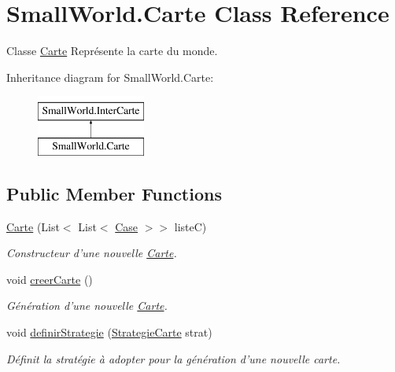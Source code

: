 \hypertarget{class_small_world_1_1_carte}{\section{Small\-World.\-Carte Class Reference}
\label{class_small_world_1_1_carte}
}


Classe \hyperlink{class_small_world_1_1_carte}{Carte} Représente la carte du monde.  


Inheritance diagram for Small\-World.\-Carte\-:\begin{figure}[H]
\begin{center}
\leavevmode
\includegraphics[height=2.000000cm]{class_small_world_1_1_carte}
\end{center}
\end{figure}
\subsection*{Public Member Functions}
\begin{DoxyCompactItemize}
\item 
\hyperlink{class_small_world_1_1_carte_a3795b7cf629c8e9151bbb2410bc39eb3}{Carte} (List$<$ List$<$ \hyperlink{class_small_world_1_1_case}{Case} $>$$>$ liste\-C)
\begin{DoxyCompactList}\small\item\em Constructeur d'une nouvelle \hyperlink{class_small_world_1_1_carte}{Carte}. \end{DoxyCompactList}\item 
void \hyperlink{class_small_world_1_1_carte_a412690bcb32264b5282913660c5e38f8}{creer\-Carte} ()
\begin{DoxyCompactList}\small\item\em Génération d'une nouvelle \hyperlink{class_small_world_1_1_carte}{Carte}. \end{DoxyCompactList}\item 
\hypertarget{class_small_world_1_1_carte_aad692a68904925a11d5307181ca83c5f}{void \hyperlink{class_small_world_1_1_carte_aad692a68904925a11d5307181ca83c5f}{definir\-Strategie} (\hyperlink{class_small_world_1_1_strategie_carte}{Strategie\-Carte} strat)}\label{class_small_world_1_1_carte_aad692a68904925a11d5307181ca83c5f}

\begin{DoxyCompactList}\small\item\em Définit la stratégie à adopter pour la génération d'une nouvelle carte. \end{DoxyCompactList}\end{DoxyCompactItemize}
